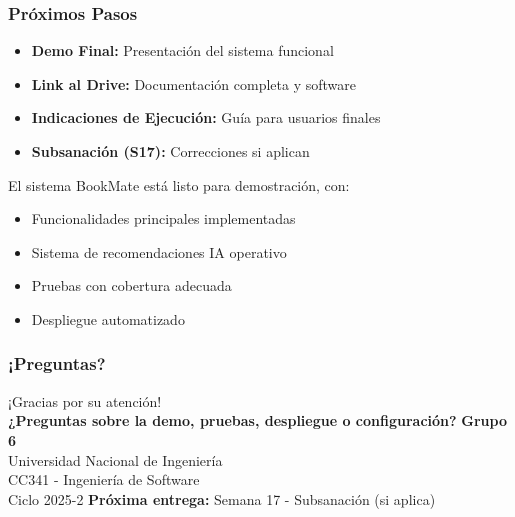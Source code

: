 \documentclass[aspectratio=169]{beamer}
\begin{document}
\begin{frame}
\frametitle{Próximos Pasos}
\begin{itemize}
  \item \textbf{Demo Final:} Presentación del sistema funcional
  \item \textbf{Link al Drive:} Documentación completa y software
  \item \textbf{Indicaciones de Ejecución:} Guía para usuarios finales
  \item \textbf{Subsanación (S17):} Correcciones si aplican
\end{itemize}

\vspace{0.5cm}

\begin{tcolorbox}[title=Estado del Proyecto]
El sistema BookMate está listo para demostración, con:
\begin{itemize}
  \item Funcionalidades principales implementadas
  \item Sistema de recomendaciones IA operativo
  \item Pruebas con cobertura adecuada
  \item Despliegue automatizado
\end{itemize}
\end{tcolorbox}
\end{frame}

\begin{frame}
\frametitle{¡Preguntas?}
\begin{center}
  \Large ¡Gracias por su atención! \\
  \vspace{1cm}
  \textbf{¿Preguntas sobre la demo, pruebas, despliegue o configuración?}
  \vspace{1cm}
  \normalsize
  \textbf{Grupo 6}\\
  Universidad Nacional de Ingeniería\\
  CC341 - Ingeniería de Software\\
  Ciclo 2025-2
  \vspace{0.5cm}
  \textbf{Próxima entrega:} Semana 17 - Subsanación (si aplica)
\end{center}
\end{frame}
\end{document}
